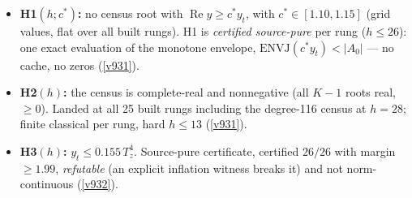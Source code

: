 \begin{itemize}
\item \textbf{H1$(h; c^*)$:} no census root with $\operatorname{Re} y \ge c^* y_t$, with
  $c^* \in [1.10, 1.15]$ (grid values, flat over all built rungs).  H1 is \emph{certified
  source-pure} per rung ($h \le 26$): one exact evaluation of the monotone envelope,
  $\mathrm{ENVJ}(c^* y_t) < |A_0|$ --- no cache, no zeros (\vref{v931}).
\item \textbf{H2$(h)$:} the census is complete-real and nonnegative (all $K{-}1$ roots real,
  $\ge 0$).  Landed at all 25 built rungs including the degree-116 census at $h = 28$; finite
  classical per rung, hard $h \le 13$ (\vref{v931}).
\item \textbf{H3$(h)$:} $y_t \le 0.155\,T_z^4$.  Source-pure certificate, certified $26/26$
  with margin $\ge 1.99$, \emph{refutable} (an explicit inflation witness breaks it) and not
  norm-continuous (\vref{v932}).
\end{itemize}


